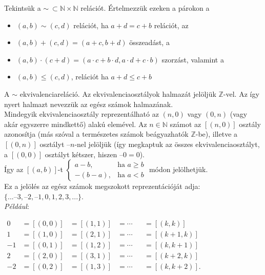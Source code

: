 \documentclass[12pt,margin=0px]{article}
\begin{document}
        \noindent Tekintsük a $\sim\ \subset\mathbb{N}\times\mathbb{N}$ relációt. Értelmezzük ezeken a párokon a
        \begin{itemize}[leftmargin=5.5mm]
        \renewcommand{\labelitemi}{$\vcenter{\hbox{\tiny$\bullet$}}$}
            \item $(a,b) \sim (c,d)$ relációt, ha $a+d = c+b$ relációt, az
            \item $(a,b)+(c,d) = (a+c,b+d)$ összeadást, a
            \item $(a,b)\cdot(c+d) = (a \cdot c + b \cdot d, a \cdot d + c \cdot b)$ szorzást, valamint a
            \item $(a,b)\leq (c,d)$, relációt ha $a+d \leq c + b$
        \end{itemize}

        \noindent A $\sim$ ekvivalenciareláció. Az ekvivalenciaosztályok halmazát jelöljük $\mathbb{Z}$-vel. Az így nyert halmazt nevezzük az egész számok halmazának.\\

        \noindent Mindegyik ekvivalenciaosztály reprezentálható az $(n,0)$ vagy $(0,n)$ (vagy akár egyszerre mindkettő) alakú elemével. Az $n \in \mathbb{N}$ számot az $[(n,0)]$ osztály azonosítja (más szóval a természetes számok beágyazhatók $\mathbb{Z}$-be), illetve a $[(0,n)]$ osztályt $–n$-nel jelöljük (így megkaptuk az összes ekvivalenciaosztályt, a $[(0,0)]$ osztályt kétszer, hiszen $–0=0$).\\

        \noindent Így az $[(a,b)]$-t
            ${\displaystyle {\begin{cases}a-b,&{\mbox{ha }}a\geq b\\-(b-a),&{\mbox{ha }}a<b\end{cases}}}$
        módon jelölhetjük.\\

        \noindent Ez a jelölés az egész számok megszokott reprezentációját adja: $\{... –3, –2, –1, 0, 1, 2, 3, ...\}$.\\
\newpage
        \noindent \emph{Például}:

        ${\displaystyle {\begin{aligned}0&=[(0,0)]&=[(1,1)]&=\cdots &&=[(k,k)]\\1&=[(1,0)]&=[(2,1)]&=\cdots &&=[(k+1,k)]\\-1&=[(0,1)]&=[(1,2)]&=\cdots &&=[(k,k+1)]\\2&=[(2,0)]&=[(3,1)]&=\cdots &&=[(k+2,k)]\\-2&=[(0,2)]&=[(1,3)]&=\cdots &&=[(k,k+2)].\end{aligned}}}$\\
\end{document}
